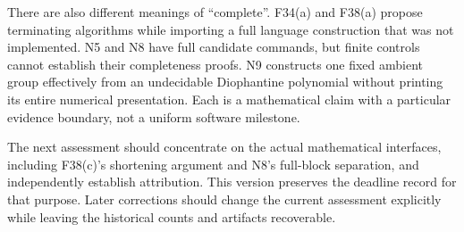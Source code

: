 There are also different meanings of ``complete''. F34(a) and F38(a)
propose terminating algorithms while importing a full language
construction that was not implemented. N5 and N8 have full candidate
commands, but finite controls cannot establish their completeness
proofs. N9 constructs one fixed ambient group effectively from an
undecidable Diophantine polynomial without printing its entire
numerical presentation. Each is a mathematical claim with a particular
evidence boundary, not a uniform software milestone.

The next assessment should concentrate on the actual mathematical
interfaces, including F38(c)'s shortening argument and N8's full-block
separation, and independently establish attribution. This version
preserves the deadline record for that purpose. Later corrections
should change the current assessment explicitly while leaving the
historical counts and artifacts recoverable.
